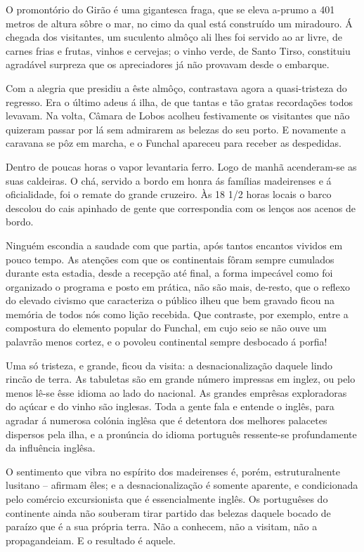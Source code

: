 \documentclass[9pt]{article}
\begin{document}
O promontório do Girão é uma gigantesca fraga, que se eleva \mbox{a-pru}\-mo
a 401 metros de altura sôbre o mar, no cimo da qual está construído um
miradouro. Á chegada dos visitantes, um suculento almôço ali lhes foi servido ao ar livre, de carnes frias e frutas, vinhos e cervejas; o vinho verde, de Santo Tirso, constituiu a\-gra\-dá\-vel surpreza que os apreciadores já
não provavam desde o embarque.

Com a alegria que presidiu a êste almôço, contrastava agora a qua\-\mbox{si-tristeza} do regresso. Era o último adeus á i\-lha, de que tantas e tão gratas recorda\-ções todos levavam. Na volta, Câmara de Lobos aco\-lheu festivamente os visitantes que não quizeram passar por lá sem admirarem as belezas do seu porto. E novamente a caravana se pôz em marcha, e o Funchal apareceu para receber as despedidas.

Dentro de poucas horas o vapor levantaria ferro. Logo de manhã acenderam-se as suas caldeiras. O chá, servido a bordo em honra ás fa\-mí\-lias
madeirenses e á oficialidade, foi o remate do gran\-de cruzeiro. Às 18 1/2
horas locais o barco descolou do cais apinhado de gente que correspondia
com os lenços aos acenos de bordo.

Ninguém escondia a saudade com que partia, após tantos encantos vividos em pouco tempo. As aten\-ções com que os continentais fôram sempre cumulados durante esta estadia, desde a recep\-ção até final, a forma impecável
como foi organizado o programa e posto em prática, não são mais, de-resto,
que o reflexo do elevado civismo que ca\-ra\-cte\-ri\-za o público i\-lheu que bem
gravado ficou na memória de todos nós como li\-ção recebida. Que contraste, por exemplo, entre a compostura do elemento popular do Funchal, em cujo
seio se não ouve um palavrão menos cortez, e o povoleu continental sempre
desbocado á porfia!

Uma só tristeza, e gran\-de, ficou da visita: a desna\-cio\-naliza\-ção daquele lindo rincão de terra. As tabuletas são em gran\-de número impressas
em inglez, ou pelo menos lê-se êsse idioma ao lado do na\-cio\-nal. As gran\-des
emprêsas exploradoras do açúcar e do vinho são inglesas. Toda a gente fala
e entende o inglês, para agradar á numerosa colónia inglêsa que é detentora
dos me\-lhores palacetes dispersos pela i\-lha, e a pronúncia do idioma por\-tu\-guês ressente-se profundamente da influência inglêsa.

O sentimento que vibra no espírito dos madeirenses é, porém, estruturalnente lusitano -- afirmam êles; e a desna\-cio\-naliza\-ção é somente aparente,
e condicionada pelo comércio excursionista que é essencialmente inglês. Os
por\-tu\-guêses do continente ainda não souberam tirar partido das belezas daquele bocado de paraízo que é a sua própria terra. Não a conhecem, não a
visitam, não a propagandeiam. E o resultado é aquele.
\end{document}

